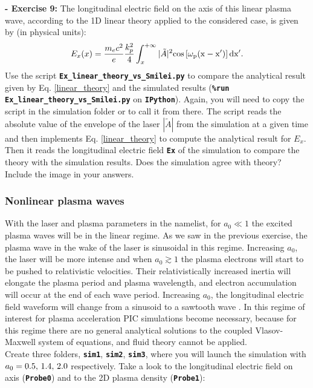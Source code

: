 \documentclass[a4paper,12pt]{extarticle}
\newcommand{\commandline}[1]{\texttt{\textbf{#1}}}
\begin{document}
\textbf{ - Exercise 9:} The longitudinal electric field on the axis of this linear plasma wave, according to the 1D linear theory \cite{Esarey2009} applied to the considered case, is given by (in physical units):
\begin{equation}\label{linear_theory}
E_x(x) = \frac{m_e c^2}{e}\frac{k_p^2}{4} \int_x^{+\infty} |\tilde{A}|^2\rm{cos}\left[\omega_p(x-x')\right]dx'.\\
\end{equation}
Use the script \commandline{Ex\_linear\_theory\_vs\_Smilei.py} to compare the analytical result given by Eq. \ref{linear_theory} and the simulated results (\commandline{\%run Ex\_linear\_theory\_vs\_Smilei.py} on \commandline{IPython}). Again, you will need to copy the script in the simulation folder or to call it from there. The script reads the absolute value of the envelope of the laser $|\tilde{A}|$ from the simulation at a given time and then implements Eq. \ref{linear_theory} to compute the analytical result for $E_x$. Then it reads the longitudinal electric field \commandline{Ex} of the simulation to compare the theory with the simulation results. Does the simulation agree with theory? Include the image in your answers.

\subsubsection {Nonlinear plasma waves}
With the laser and plasma parameters in the namelist, for $a_0\ll1$ the excited plasma waves will be in the linear regime. As we saw in the previous exercise, the plasma wave in the wake of  the laser is sinusoidal in this regime.
Increasing $a_0$, the laser will be more intense and when $a_0\gtrsim1$ the plasma electrons will start to  be pushed to relativistic velocities. Their relativistically increased inertia will elongate the plasma period and plasma wavelength, and electron accumulation will occur at the end of each wave period. Increasing $a_0$, the longitudinal electric field waveform will change from a sinusoid to a sawtooth wave \cite{Esarey2009}. In this regime of interest for plasma acceleration PIC simulations become necessary, because for this regime there are no general analytical solutions to the coupled Vlasov-Maxwell system of equations,  and fluid theory cannot be applied.\\

Create three folders, \commandline{sim1}, \commandline{sim2}, \commandline{sim3}, where you will launch the simulation  with $a_0=0.5,\thinspace 1.4,\thinspace 2.0$ respectively. Take a look to the longitudinal electric field on axis (\commandline{Probe0}) and to the 2D plasma density (\commandline{Probe1}):\\
\end{document}
